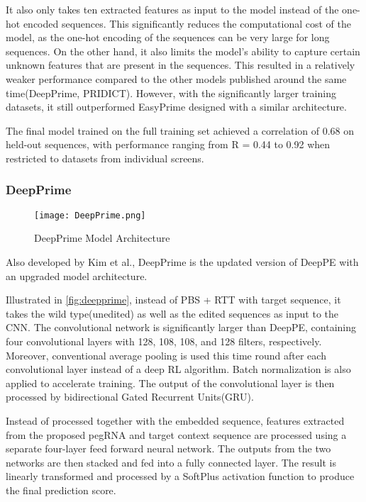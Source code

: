 \documentclass[12pt]{article}
\begin{document}
It also only takes ten extracted features as input to the model instead of the one-hot encoded sequences. This significantly reduces the computational cost of the model, as the one-hot encoding of the sequences can be very large for long sequences. On the other hand, it also limits the model's ability to capture certain unknown features that are present in the sequences. This resulted in a relatively weaker performance compared to the other models published around the same time(DeepPrime, PRIDICT). However, with the significantly larger training datasets, it still outperformed EasyPrime designed with a similar architecture.

The final model trained on the full training set achieved a correlation of 0.68 on held-out sequences, with performance ranging from R = 0.44 to 0.92 when restricted to datasets from individual screens.

\subsubsection{DeepPrime}

\begin{figure}[ht]
    \centering
    \texttt{[image: DeepPrime.png]}
    \caption{DeepPrime Model Architecture}
    \label{fig:deepprime}
\end{figure}


Also developed by Kim et al., DeepPrime is the updated version of DeepPE with an upgraded model architecture. 

Illustrated in \autoref{fig:deepprime}, instead of PBS + RTT with target sequence, it takes the wild type(unedited) as well as the edited sequences as input to the CNN. The convolutional network is significantly larger than DeepPE, containing four convolutional layers with 128, 108, 108, and 128 filters, respectively. Moreover, conventional average pooling is used this time round after each convolutional layer instead of a deep RL algorithm. Batch normalization is also applied to accelerate training.  The output of the convolutional layer is then processed by bidirectional Gated Recurrent Units(GRU). 

Instead of processed together with the embedded sequence, features extracted from the proposed pegRNA and target context sequence are processed using a separate four-layer feed forward neural network. The outputs from the two networks are then stacked and fed into a fully connected layer. The result is linearly transformed and processed by a SoftPlus activation function to produce the final prediction score.
\end{document}
